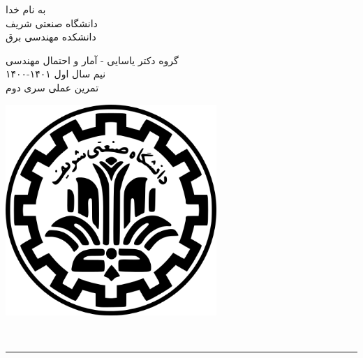 \documentclass[a4paper]{article}
\begin{document}
\begin{minipage}{0.6\textwidth}
\begin{bf}
\begin{center}
	به نام خدا\\
	\vspace{0.25cm}
	دانشگاه صنعتی شریف\\
	\vspace{0.25cm}
	دانشکده مهندسی برق\\
	\vspace{0.5cm}

\large
گروه دکتر یاسایی - آمار و احتمال مهندسی \\
نیم سال اول
۱۴۰۱-۱۴۰۰\\
\Large
\vspace{0.4cm}
تمرین عملی سری دوم\\
\end{center}
\end{bf}
\normalsize
\end{minipage} \hfill
\begin{minipage}{0.35\textwidth}
\begin{flushleft}
\includegraphics[width=0.6\textwidth]{Shariflogo.png}\\ \large
\end{flushleft}

 \end{minipage}
\\

\rule[0.1\baselineskip]{\textwidth}{1.5pt}

\large
\end{document}
